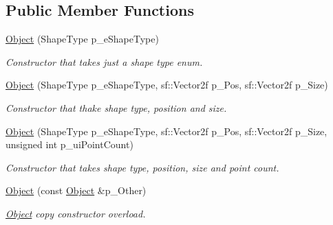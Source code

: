\subsection*{Public Member Functions}
\begin{DoxyCompactItemize}
\item 
\mbox{\label{class_object_ae240ad6fec4239f2d631cefacd7fd8dd}} 
\hyperlink{class_object_ae240ad6fec4239f2d631cefacd7fd8dd}{Object} (Shape\+Type p\+\_\+e\+Shape\+Type)
\begin{DoxyCompactList}\small\item\em Constructor that takes just a shape type enum. \end{DoxyCompactList}\item 
\mbox{\label{class_object_ae525cdbb73d2ca88dd5c9422405744d4}} 
\hyperlink{class_object_ae525cdbb73d2ca88dd5c9422405744d4}{Object} (Shape\+Type p\+\_\+e\+Shape\+Type, sf\+::\+Vector2f p\+\_\+\+Pos, sf\+::\+Vector2f p\+\_\+\+Size)
\begin{DoxyCompactList}\small\item\em Constructor that thake shape type, position and size. \end{DoxyCompactList}\item 
\mbox{\label{class_object_a50cf60a49f4c109a63b8ba2a802d24c3}} 
\hyperlink{class_object_a50cf60a49f4c109a63b8ba2a802d24c3}{Object} (Shape\+Type p\+\_\+e\+Shape\+Type, sf\+::\+Vector2f p\+\_\+\+Pos, sf\+::\+Vector2f p\+\_\+\+Size, unsigned int p\+\_\+ui\+Point\+Count)
\begin{DoxyCompactList}\small\item\em Constructor that takes shape type, position, size and point count. \end{DoxyCompactList}\item 
\mbox{\label{class_object_adec6108282a005f78653c7b53931167f}} 
\hyperlink{class_object_adec6108282a005f78653c7b53931167f}{Object} (const \hyperlink{class_object}{Object} \&p\+\_\+\+Other)
\begin{DoxyCompactList}\small\item\em \hyperlink{class_object}{Object} copy constructor overload. \end{DoxyCompactList}\item 
\mbox{\label{class_object_aa904f948ec72f2cbec99a9eee5ed387e}} 

\end{DoxyCompactItemize}
